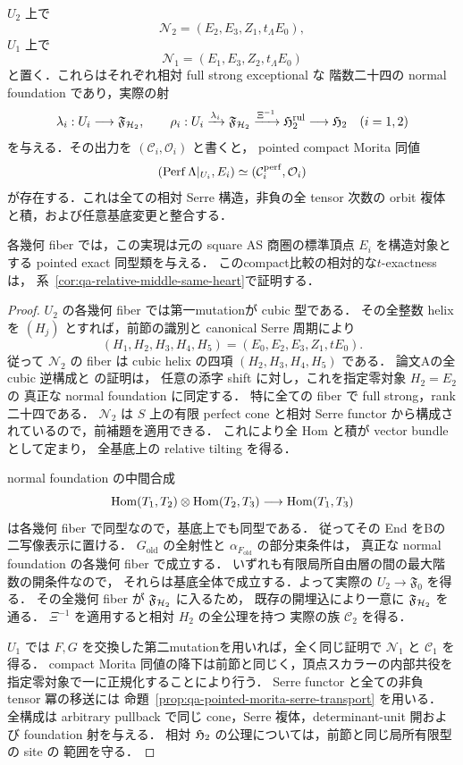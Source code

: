 \begin{theorem}[中間頂点の開上の実際の相対$H_2$族]
\label{thm:qa-relative-avatar-middle-h2-realizations}
$U_2$ 上で
\[
 \mathcal N_2=(E_2,E_3,Z_1,t_\Lambda E_0),
\]
$U_1$ 上で
\[
 \mathcal N_1=(E_1,E_3,Z_2,t_\Lambda E_0)
\]
と置く．これらはそれぞれ相対 full strong exceptional な
階数二十四の normal foundation であり，実際の射
\[
 \lambda_i:U_i\longrightarrow\mathfrak F_{\mathcal H_2},\qquad
 \rho_i:U_i\xrightarrow{\lambda_i}\mathfrak F_{\mathcal H_2}
      \xrightarrow{\Xi^{-1}}\mathfrak H_2^{\mathrm{rul}}
      \longrightarrow\mathfrak H_2\quad(i=1,2)
\]
を与える．その出力を $(\mathcal C_i,\mathcal O_i)$ と書くと，
pointed compact Morita 同値
\[
 (\operatorname{Perf}\Lambda|_{U_i},E_i)
       \simeq(\mathcal C_i^{\mathrm{perf}},\mathcal O_i)
\]
が存在する．これは全ての相対 Serre 構造，非負の全 tensor 次数の
orbit 複体と積，および任意基底変更と整合する．

各幾何 fiber では，この実現は元の square AS 商圏の標準頂点
$E_i$ を構造対象とする pointed exact 同型類を与える．
このcompact比較の相対的な$t$-exactnessは，
系~\ref{cor:qa-relative-middle-same-heart}で証明する．
\end{theorem}
\begin{proof}
$U_2$ の各幾何 fiber では第一mutationが cubic 型である．
その全整数 helix を $(H_j)$ とすれば，前節の識別と
canonical Serre 周期により
\[
 (H_1,H_2,H_3,H_4,H_5)
 =(E_0,E_2,E_3,Z_1,tE_0).
\]
従って $\mathcal N_2$ の fiber は cubic helix の四項
$(H_2,H_3,H_4,H_5)$ である．
論文Aの全 cubic 逆構成と \cite[\texttt{thm:cubic-coverage}]{QuadricIntrinsic2026} の証明は，
任意の添字 shift に対し，これを指定零対象 $H_2=E_2$ の
真正な normal foundation に同定する．
特に全ての fiber で full strong，rank 二十四である．
$\mathcal N_2$ は $S$ 上の有限 perfect cone と相対 Serre functor
から構成されているので，前補題を適用できる．
これにより全 Hom と積が vector bundle として定まり，
全基底上の relative tilting を得る．

normal foundation の中間合成
\[
 \operatorname{Hom}(T_1,T_2)\otimes\operatorname{Hom}(T_2,T_3)
   \longrightarrow\operatorname{Hom}(T_1,T_3)
\]
は各幾何 fiber で同型なので，基底上でも同型である．
従ってその End をBの二写像表示に置ける．
$G_{\mathrm{old}}$ の全射性と $\alpha_{F_{\mathrm{old}}}$ の部分束条件は，
真正な normal foundation の各幾何 fiber で成立する．
いずれも有限局所自由層の間の最大階数の開条件なので，
それらは基底全体で成立する．よって実際の
$U_2\to\mathfrak F_0$ を得る．
その全幾何 fiber が $\mathfrak F_{\mathcal H_2}$ に入るため，
既存の開埋込により一意に $\mathfrak F_{\mathcal H_2}$ を通る．
$\Xi^{-1}$ を適用すると相対 $H_2$ の全公理を持つ
実際の族 $\mathcal C_2$ を得る．

$U_1$ では $F,G$ を交換した第二mutationを用いれば，全く同じ証明で
$\mathcal N_1$ と $\mathcal C_1$ を得る．
compact Morita 同値の降下は前節と同じく，頂点スカラーの内部共役を
指定零対象で一に正規化することにより行う．
Serre functor と全ての非負 tensor 冪の移送には
命題~\ref{prop:qa-pointed-morita-serre-transport} を用いる．
全構成は arbitrary pullback で同じ cone，Serre 複体，determinant-unit
開および foundation 射を与える．
相対 $\mathfrak H_2$ の公理については，前節と同じ局所有限型の site の
範囲を守る．
\end{proof}

